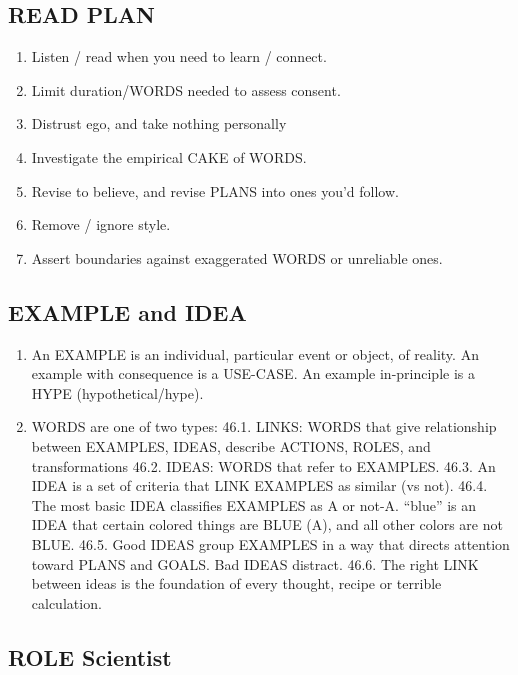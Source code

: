 \documentclass[
]{book}
\providecommand{\tightlist}{%
  \setlength{\itemsep}{0pt}\setlength{\parskip}{0pt}}
\begin{document}
\hypertarget{read-plan}{%
\subsection{READ PLAN}\label{read-plan}}

\begin{enumerate}
\def\labelenumi{\arabic{enumi}.}
\setcounter{enumi}{37}
\tightlist
\item
  Listen / read when you need to learn / connect.
\item
  Limit duration/WORDS needed to assess consent.
\item
  Distrust ego, and take nothing personally
\item
  Investigate the empirical CAKE of WORDS.
\item
  Revise to believe, and revise PLANS into ones you'd follow.
\item
  Remove / ignore style.
\item
  Assert boundaries against exaggerated WORDS or unreliable ones.
\end{enumerate}

\hypertarget{example-and-idea}{%
\subsection{EXAMPLE and IDEA}\label{example-and-idea}}

\begin{enumerate}
\def\labelenumi{\arabic{enumi}.}
\setcounter{enumi}{44}
\tightlist
\item
  An EXAMPLE is an individual, particular event or object, of reality. An
  example with consequence is a USE-CASE. An example in-principle is a
  HYPE (hypothetical/hype).
\item
  WORDS are one of two types:
  46.1. LINKS: WORDS that give relationship between EXAMPLES, IDEAS,
  describe ACTIONS, ROLES, and transformations
  46.2. IDEAS: WORDS that refer to EXAMPLES.
  46.3. An IDEA is a set of criteria that LINK EXAMPLES as similar (vs not).
  46.4. The most basic IDEA classifies EXAMPLES as A or not-A. ``blue'' is
  an IDEA that certain colored things are BLUE (A), and all other
  colors are not BLUE.
  46.5. Good IDEAS group EXAMPLES in a way that directs attention
  toward PLANS and GOALS. Bad IDEAS distract.
  46.6. The right LINK between ideas is the foundation of every thought,
  recipe or terrible calculation.
\end{enumerate}

\hypertarget{role-scientist}{%
\subsection{ROLE Scientist}\label{role-scientist}}
\end{document}
